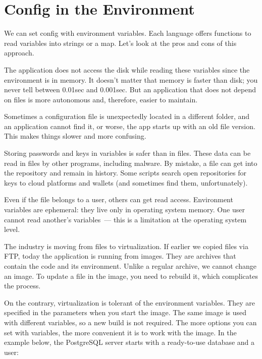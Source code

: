 \section{Config in the Environment}

We can set config with environment variables. Each language offers functions to read variables into strings or a map. Let's look at the pros and cons of this approach.

The application does not access the disk while reading these variables since the environment is in memory. It doesn't matter that memory is faster than disk; you never tell between 0.01sec and 0.001sec. But an application that does not depend on files is more autonomous and, therefore, easier to maintain.

Sometimes a configuration file is unexpectedly located in a different folder, and an application cannot find it, or worse, the app starts up with an old file version. This makes things slower and more confusing.

\label{password-note}


Storing passwords and keys in variables is safer than in files. These data can be read in files by other programs, including malware. By mistake, a file can get into the repository and remain in history. Some scripts search open repositories for keys to cloud platforms and wallets (and sometimes find them, unfortunately).

Even if the file belongs to a user, others can get read access. Environment variables are ephemeral: they live only in operating system memory. One user cannot read another's variables~--- this is a limitation at the operating system level.


The industry is moving from files to virtualization. If earlier we copied files via FTP, today the application is running from images. They are archives that contain the code and its environment. Unlike a regular archive, we cannot change an image. To update a file in the image, you need to rebuild it, which complicates the process.


On the contrary, virtualization is tolerant of the environment variables. They are specified in the parameters when you start the image. The same image is used with different variables, so a new build is not required. The more options you can set with variables, the more convenient it is to work with the image. In the example below, the PostgreSQL server starts with a ready-to-use database and a user:

